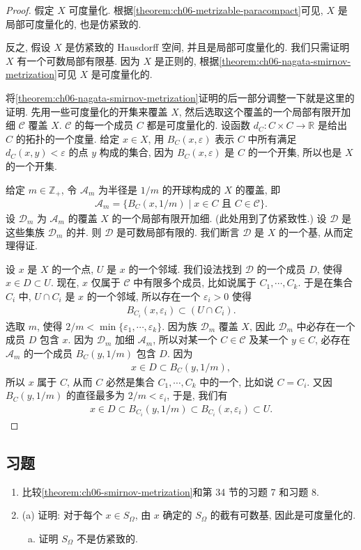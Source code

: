 \documentclass[../../main.tex]{subfiles}
\begin{document}
\begin{proof}
假定 $X$ 可度量化. 根据\cref{theorem:ch06-metrizable-paracompact}可见, $X$ 是局部可度量化的, 也是仿紧致的.

反之, 假设 $X$ 是仿紧致的 Hausdorff 空间, 并且是局部可度量化的. 我们只需证明 $X$ 有一个可数局部有限基. 因为 $X$ 是正则的, 根据\cref{theorem:ch06-nagata-smirnov-metrization}可见 $X$ 是可度量化的.

将\cref{theorem:ch06-nagata-smirnov-metrization}证明的后一部分调整一下就是这里的证明. 先用一些可度量化的开集来覆盖 $X$, 然后选取这个覆盖的一个局部有限开加细 $\mathcal{C}$ 覆盖 $X$. $\mathcal{C}$ 的每一个成员 $C$ 都是可度量化的. 设函数 $d_C\colon C\times C\to\mathbb{R}$ 是给出 $C$ 的拓扑的一个度量. 给定 $x\in X$, 用 $B_C(x,\varepsilon)$ 表示 $C$ 中所有满足 $d_C(x,y)<\varepsilon$ 的点 $y$ 构成的集合, 因为 $B_C(x,\varepsilon)$ 是 $C$ 的一个开集, 所以也是 $X$ 的一个开集.

给定 $m\in\mathbb{Z}_+$, 令 $\mathcal{A}_m$ 为半径是 $1/m$ 的开球构成的 $X$ 的覆盖, 即
\begin{align*}
\mathcal{A}_m=\{B_C(x,1/m)\mid x\in C\text{ 且 }C\in\mathcal{C}\}.
\end{align*}
设 $\mathcal{D}_m$ 为 $\mathcal{A}_m$ 的覆盖 $X$ 的一个局部有限开加细. (此处用到了仿紧致性.) 设 $\mathcal{D}$ 是这些集族 $\mathcal{D}_m$ 的并. 则 $\mathcal{D}$ 是可数局部有限的. 我们断言 $\mathcal{D}$ 是 $X$ 的一个基, 从而定理得证.

设 $x$ 是 $X$ 的一个点, $U$ 是 $x$ 的一个邻域. 我们设法找到 $\mathcal{D}$ 的一个成员 $D$, 使得 $x\in D\subset U$. 现在, $x$ 仅属于 $\mathcal{C}$ 中有限多个成员, 比如说属于 $C_1,\cdots,C_k$. 于是在集合 $C_i$ 中, $U\cap C_i$ 是 $x$ 的一个邻域, 所以存在一个 $\varepsilon_i>0$ 使得
\begin{align*}
B_{C_i}(x,\varepsilon_i)\subset(U\cap C_i).
\end{align*}
选取 $m$, 使得 $2/m<\min\{\varepsilon_1,\cdots,\varepsilon_k\}$. 因为族 $\mathcal{D}_m$ 覆盖 $X$, 因此 $\mathcal{D}_m$ 中必存在一个成员 $D$ 包含 $x$. 因为 $\mathcal{D}_m$ 加细 $\mathcal{A}_m$, 所以对某一个 $C\in\mathcal{C}$ 及某一个 $y\in C$, 必存在 $\mathcal{A}_m$ 的一个成员 $B_C(y,1/m)$ 包含 $D$. 因为
\begin{align*}
x\in D\subset B_C(y,1/m),
\end{align*}
所以 $x$ 属于 $C$, 从而 $C$ 必然是集合 $C_1,\cdots,C_k$ 中的一个, 比如说 $C=C_i$. 又因 $B_C(y,1/m)$ 的直径最多为 $2/m<\varepsilon_i$, 于是, 我们有
\begin{align*}
x\in D\subset B_{C_i}(y,1/m)\subset B_{C_i}(x,\varepsilon_i)\subset U.
\end{align*}
\end{proof}

\subsection*{习题}

\begin{enumerate}
\item 比较\cref{theorem:ch06-smirnov-metrization}和第 34 节的习题 7 和习题 8.
\item (a) 证明: 对于每个 $x\in S_\Omega$, 由 $x$ 确定的 $S_\Omega$ 的截有可数基, 因此是可度量化的.
\begin{enumerate}[(b)]
\item 证明 $S_\Omega$ 不是仿紧致的.
\end{enumerate}
\end{enumerate}
\end{document}

